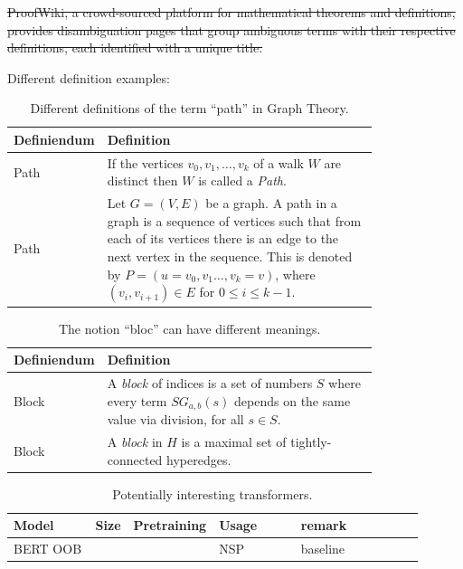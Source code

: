 

\st{ProofWiki, a crowd-sourced platform for mathematical theorems and definitions, provides disambiguation pages that group ambiguous terms with their respective definitions, each identified with a unique title. }







Different definition examples:

\begin{table}
    \centering
    \begin{tabular}{|l|p{0.8\linewidth}|}
          \hline
          Definiendum&Definition\\\hline
          Path&If the vertices $v_0,v_1,\ldots,v_k$ of a walk $W$ are distinct then $W$ is called a \textit{Path}.\\\hline
          Path&Let $G=(V,E)$ be a graph. A path in a graph is a sequence of vertices such that from each of its vertices there is an edge to the next vertex in the sequence. This is denoted by $P=(u=v_0,v_1\ldots,v_k=v)$, where $(v_i,v_{i+1}) \in E$ for $0 \le i \le k-1$. \\\hline
    \end{tabular}
    \caption{Different definitions of the term ``path'' in Graph Theory.}
    \label{tab:paper_def_example_paraphasing}
\end{table}
\begin{table}
    \centering
    \begin{tabular}{|l|p{0.8\linewidth}|}
          \hline
          Definiendum&Definition\\\hline
          Block&A \emph{block} of indices is a set of numbers $S$ where every term $SG_{a,b}(s)$ depends on the same value via division, for all $s\in S$.\\\hline
          Block&A \emph{block} in  $H$ is a maximal set of tightly-connected hyperedges.\\\hline
    \end{tabular}
    \caption{The notion ``bloc'' can have different meanings.}
    \label{tab:paper_def_example_ambi}
\end{table}


\begin{table}
    \centering
    \begin{tabular}{|p{0.2\linewidth}|l|p{0.2\linewidth}|p{0.2\linewidth}|p{0.3\linewidth}|}
          \hline
             Model& Size & Pretraining & Usage & remark\\ \hline
             BERT OOB&  &  & NSP& baseline \\ \hline
    \end{tabular}
    \caption{Potentially interesting transformers.}
    \label{tab:models}
\end{table}


